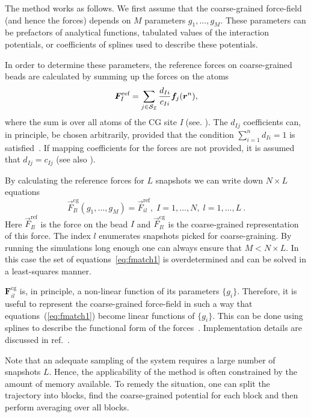 The method works as follows. We first assume that the coarse-grained force-field (and hence the forces) depends on $M$ parameters $g_1,...,g_M $. These parameters can be prefactors of analytical functions, tabulated values of the interaction potentials, or coefficients of splines used to describe these potentials.

In order to determine these parameters, the reference forces on coarse-grained beads are calculated by summing up the forces on the atoms
\begin{equation}
  {\vec F}_I^\text{ref} = \sum_{j \in {\cal S_I}} \frac{d_{Ii}}{c_{Ii}} {\vec f}_j({\vec r^n}),
  \label{eq:force_mapping}
\end{equation}
where the sum is over all atoms of the CG site {\it I} (see. ).
The $d_{Ij}$ coefficients can, in principle, be chosen arbitrarily, provided that the condition $ \sum_{i=1}^{n}d_{Ii}=1$ is satisfied~\cite{Noid:2008.1}. If mapping coefficients for the forces are not provided, it is assumed that $d_{Ij} = c_{Ij}$ (see also ).

By calculating the reference forces for $L$ snapshots we can write down $N \times L$ equations
%
\begin{equation}
  {\vec F}_{Il}^\text{cg}(g_1, \dots ,g_M)=\vec F_{il}^\text{ref},\;
  I=1,\dots,N,\; l=1,\dots,L~.
  \label{eq:fmatch1}
\end{equation}
%
Here ${\vec F}_{Il}^\text{ref}$ is the force on the bead $I$ and ${\vec F}_{Il}^\text{cg} $ is the coarse-grained representation of this force. The index $l$ enumerates snapshots picked for coarse-graining. By running the simulations long enough one can always ensure that $M < N \times L$. In this case the set of equations~\ref{eq:fmatch1} is overdetermined and can be solved in a least-squares manner.

${\bm F}_{il}^\text{cg}$ is, in principle, a non-linear function of its parameters $\{g_i\}$. Therefore, it is useful to represent the coarse-grained force-field in such a way that equations~(\ref{eq:fmatch1}) become linear functions of $\{g_i\}$. This can be done using splines to describe the functional form of the forces~\cite{Izvekov:2005}. Implementation details are discussed in ref.~\cite{Ruehle:2009.a}.

Note that an adequate sampling of the system requires a large number of snapshots $L$. Hence, the applicability of the method is often constrained by the amount of memory available. To remedy the situation, one can split the trajectory into blocks, find the coarse-grained potential for each block and then perform averaging over all blocks.
